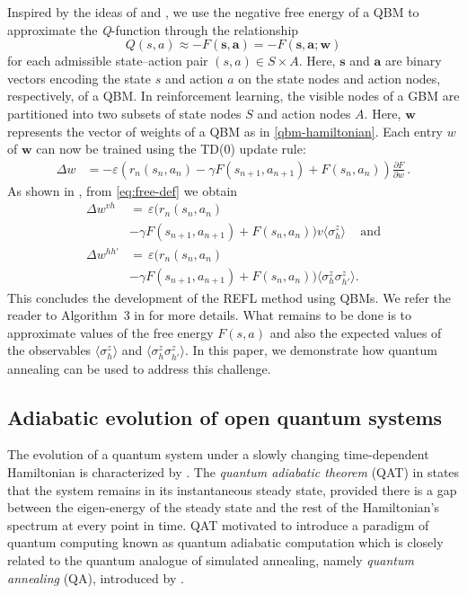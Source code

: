 \documentclass[pra,twocolumn,floatfix,superscriptaddress]{revtex4}
\begin{document}
Inspired by the ideas of \cite{hintonRBM} and \cite{1601.02036}, we use the negative free energy of a QBM to approximate the \mbox{\emph{Q}-function} through the relationship
$$Q (s, a) \approx -F (\mathbf s, \mathbf  a) = - F (\mathbf  s, \mathbf  a; \boldsymbol w)$$
for each admissible state--action pair \mbox{$(s, a) \in S\times A$}. Here, $\mathbf s$ and $\mathbf a$ are binary vectors encoding the state $s$ and action $a$ on the state nodes and action nodes, respectively, of a QBM. In reinforcement learning, the visible nodes of a GBM are partitioned into two subsets of state nodes $S$ and action nodes $A$. Here, $\boldsymbol w$ represents the vector of weights of a QBM as in \eqref{qbm-hamiltonian}. Each entry $w$ of $\boldsymbol w$ can now be trained using the TD(0) update rule:
\begin{align*}
\Delta w 
&= -\varepsilon (r_n({s}_n, {a}_n)
-\gamma F ({s}_{n+1}, {a}_{n+1}) + F({s}_n,{a}_n) ) \frac{\partial F}{\partial w}\,.\end{align*}
As shown in \cite{2016arXiv161205695C}, from \eqref{eq:free-def} we obtain
\begin{align}
\Delta w^{vh} &=\, \label{q-vh-update}
\varepsilon  (r_n({s}_n, {a}_n)\\  
&-\gamma F ({s}_{n+1}, {a}_{n+1}) + F({s}_n,{a}_n) ) v \langle \sigma_h^z \rangle\, \quad \text{and} \nonumber\\
\Delta w^{hh'} &=\, \label{q-hh-update}
\varepsilon (r_n({s}_n, {a}_n)\\ 
&-\gamma F ({s}_{n+1}, {a}_{n+1}) + F({s}_n,{a}_n) ) \langle \sigma_h^z\sigma_{h'}^z \rangle. \nonumber
\end{align}
This concludes the development of the REFL method using QBMs. We refer the reader to Algorithm~3 in \cite{2016arXiv161205695C} for more details. What remains to be done is to approximate values of the free energy $F(s, a)$ and also the expected values of the observables $\langle\sigma_h^z\rangle$ and $\langle \sigma_h^z \sigma_{h'}^z \rangle$. In this paper, we demonstrate how quantum annealing can be used to address this challenge.

\subsection{Adiabatic evolution of open quantum systems} 
\label{sec:open}

The evolution of a quantum system under a slowly changing time-dependent Hamiltonian is characterized by \cite{1928ZPhy}. The \emph{quantum adiabatic theorem} (QAT) in \cite{1928ZPhy} states that the system remains in its instantaneous steady state, provided there is a gap between the eigen-energy of the steady state and the rest of the Hamiltonian's spectrum at every point in time. QAT motivated \cite{2000quant.ph1106F} to introduce a paradigm of quantum computing known as quantum adiabatic computation which is closely related to the quantum analogue of simulated annealing, namely \emph{quantum annealing} (QA), introduced by \cite{PhysRevE.58.5355}. 
\end{document}

